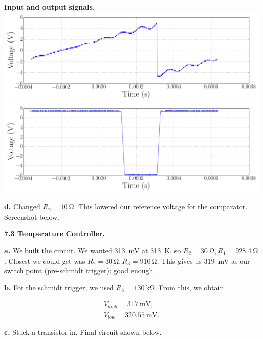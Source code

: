 \documentclass{article}
\newenvironment{2colfig}{
  \par\medskip\noindent\minipage{\linewidth}
} {
  \endminipage\par\medskip
}
\newcommand{\labhead}[1]{
  \vspace{1em}
  {\bf #1}$_{\,}$
  \hline
  \vspace{1em}
}
\begin{document}
\begin{multicols*}{2}
\begin{2colfig}
  \center
  {\bf Input and output signals.} \newline
  \includegraphics[scale=.22]{day1_lab8/ALL0004/F0004CH1}
  \includegraphics[scale=.22]{day1_lab8/ALL0004/F0004CH2}
  \label{fig:plot5}
\end{2colfig}

{\bf d.} Changed $R_2 = \SI{10}{\ohm}$. This lowered our reference voltage for the comparator. Screenshot below.
\newline

\labhead{7.3 Temperature Controller.} 
{\bf a.} We built the circuit. We wanted \SI{313}{\milli\volt} at
\SI{313}{\kelvin}, so $R_2 = \SI{30}{\ohm}, R_1 = \SI{928.4}{\ohm}$. Closest we could get was $R_2 = \SI{30}{\ohm}, R_3
= \SI{910}{\ohm}$. This gives us \SI{319}{\milli\volt} as our switch point (pre-schmidt trigger); good enough.
\newline

{\bf b.} For the schmidt trigger, we used $R_3 = \SI{130}{\kilo\ohm}$. From this, we obtain

\begin{gather}
  V_{high} = \SI{317}{\milli\volt}, \\
  V_{low} = \SI{320.55}{\milli\volt}.
\end{gather}

{\bf c.} Stuck a transistor in. Final circuit shown below.
\newline


\end{multicols*}
\end{document}
